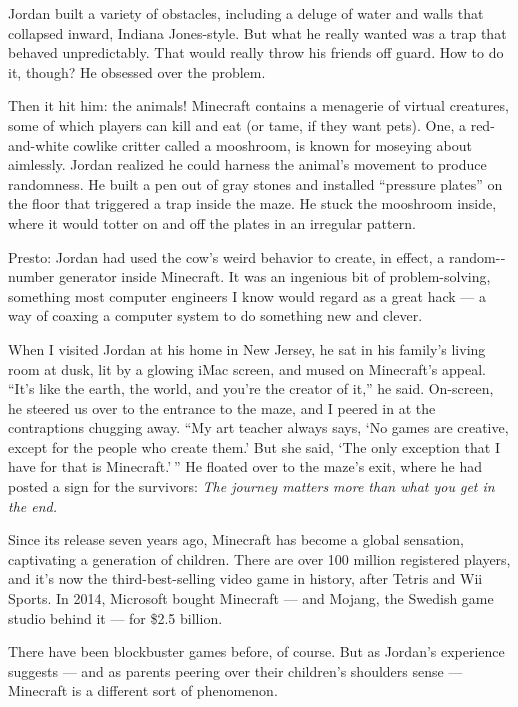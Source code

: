 Jordan built a variety of obstacles, including a deluge of water and
walls that collapsed inward, Indiana Jones-style. But what he really
wanted was a trap that behaved unpredictably. That would really throw
his friends off guard. How to do it, though? He obsessed over the
problem.

Then it hit him: the animals! Minecraft contains a menagerie of virtual
creatures, some of which players can kill and eat (or tame, if they want
pets). One, a red-and-white cowlike critter called a mooshroom, is known
for moseying about aimlessly. Jordan realized he could harness the
animal's movement to produce randomness. He built a pen out of gray
stones and installed ``pressure plates'' on the floor that triggered a
trap inside the maze. He stuck the mooshroom inside, where it would
totter on and off the plates in an irregular pattern.

Presto: Jordan had used the cow's weird behavior to create, in effect, a
random-­number generator inside Minecraft. It was an ingenious bit of
problem-­solving, something most computer engineers I know would regard
as a great hack --- a way of coaxing a computer system to do something
new and clever.

When I visited Jordan at his home in New Jersey, he sat in his family's
living room at dusk, lit by a glowing iMac screen, and mused on
Minecraft's appeal. ``It's like the earth, the world, and you're the
creator of it,'' he said. On-screen, he steered us over to the entrance
to the maze, and I peered in at the contraptions chugging away. ``My art
teacher always says, `No games are creative, except for the people who
create them.' But she said, `The only exception that I have for that is
Minecraft.' '' He floated over to the maze's exit, where he had posted a
sign for the survivors: \emph{The journey matters more than what you get
in the end.}

Since its release seven years ago, Minecraft has become a global
sensation, captivating a generation of children. There are over 100
million registered players, and it's now the third-best-­selling video
game in history, after Tetris and Wii Sports. In 2014, Microsoft bought
Minecraft --- and Mojang, the Swedish game studio behind it --- for
\$2.5 billion.

There have been blockbuster games before, of course. But as Jordan's
experience suggests --- and as parents peering over their children's
shoulders sense --- Minecraft is a different sort of phenomenon.

